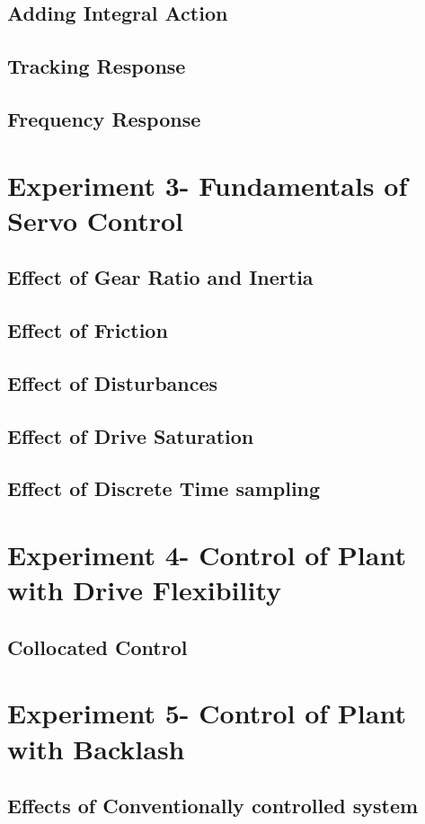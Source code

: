 \documentclass[11pt, a4paper]{article}
\begin{document}
\subsection{Adding Integral Action}
\subsection{Tracking Response}
\subsection{Frequency Response}
\section{Experiment 3- Fundamentals of Servo Control}
\subsection{Effect of Gear Ratio and Inertia}
\subsection{Effect of Friction}
\subsection{Effect of Disturbances}
\subsection{Effect of Drive Saturation}
\subsection{Effect of Discrete Time sampling}
\section{Experiment 4- Control of Plant with Drive Flexibility}
\subsection{Collocated Control}
\section{Experiment 5- Control of Plant with Backlash}
\subsection{Effects of Conventionally controlled system}
\end{document}
